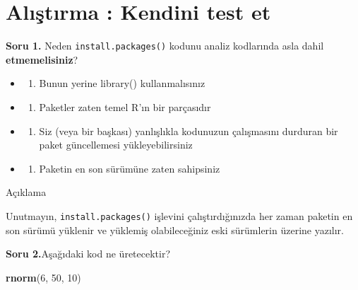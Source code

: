 \documentclass[
  oneside]{book}
\newenvironment{Shaded}{\begin{snugshade}}{\end{snugshade}}
\newcommand{\DecValTok}[1]{\textcolor[rgb]{0.00,0.00,0.81}{#1}}
\newcommand{\FunctionTok}[1]{\textcolor[rgb]{0.13,0.29,0.53}{\textbf{#1}}}
\newcommand{\NormalTok}[1]{#1}
\providecommand{\tightlist}{%
  \setlength{\itemsep}{0pt}\setlength{\parskip}{0pt}}
\begin{document}
\hypertarget{alux131ux15ftux131rma-kendini-test-et}{%
\section{Alıştırma : Kendini test et}\label{alux131ux15ftux131rma-kendini-test-et}}

\textbf{Soru 1.} Neden \texttt{install.packages()} kodunu analiz kodlarında asla dahil \textbf{etmemelisiniz}?

\begin{itemize}
\item
  \begin{enumerate}
  \def\labelenumi{(\Alph{enumi})}
  \tightlist
  \item
    Bunun yerine library() kullanmalısınız\\
  \end{enumerate}
\item
  \begin{enumerate}
  \def\labelenumi{(\Alph{enumi})}
  \setcounter{enumi}{1}
  \tightlist
  \item
    Paketler zaten temel R'ın bir parçasıdır\\
  \end{enumerate}
\item
  \begin{enumerate}
  \def\labelenumi{(\Alph{enumi})}
  \setcounter{enumi}{2}
  \tightlist
  \item
    Siz (veya bir başkası) yanlışlıkla kodunuzun çalışmasını durduran bir paket güncellemesi yükleyebilirsiniz\\
  \end{enumerate}
\item
  \begin{enumerate}
  \def\labelenumi{(\Alph{enumi})}
  \setcounter{enumi}{3}
  \tightlist
  \item
    Paketin en son sürümüne zaten sahipsiniz
  \end{enumerate}
\end{itemize}

Açıklama

Unutmayın, \texttt{install.packages()} işlevini çalıştırdığınızda her zaman paketin en son sürümü yüklenir ve yüklemiş olabileceğiniz eski sürümlerin üzerine yazılır.

\textbf{Soru 2.}Aşağıdaki kod ne üretecektir?

\begin{Shaded}
\begin{Highlighting}[]
\FunctionTok{rnorm}\NormalTok{(}\DecValTok{6}\NormalTok{, }\DecValTok{50}\NormalTok{, }\DecValTok{10}\NormalTok{)}
\end{Highlighting}
\end{Shaded}
\end{document}
